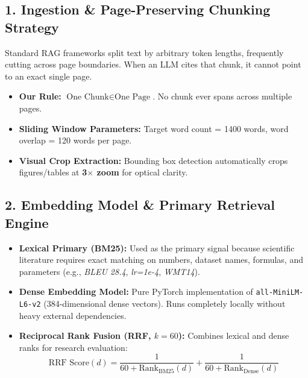 \documentclass[10pt,a4paper]{article}
\begin{document}
\subsection{1. Ingestion \& Page-Preserving Chunking Strategy}
Standard RAG frameworks split text by arbitrary token lengths, frequently cutting across page boundaries. When an LLM cites that chunk, it cannot point to an exact single page.
\begin{itemize}[leftmargin=1.5em]
    \item \textbf{Our Rule:} $\text{One Chunk} \in \text{One Page}$. No chunk ever spans across multiple pages.
    \item \textbf{Sliding Window Parameters:} Target word count = 1400 words, word overlap = 120 words per page.
    \item \textbf{Visual Crop Extraction:} Bounding box detection automatically crops figures/tables at \textbf{3$\times$ zoom} for optical clarity.
\end{itemize}

\subsection{2. Embedding Model \& Primary Retrieval Engine}
\begin{itemize}[leftmargin=1.5em]
    \item \textbf{Lexical Primary (BM25):} Used as the primary signal because scientific literature requires exact matching on numbers, dataset names, formulas, and parameters (e.g., \textit{BLEU 28.4}, \textit{lr=1e-4}, \textit{WMT14}).
    \item \textbf{Dense Embedding Model:} Pure PyTorch implementation of \texttt{all-MiniLM-L6-v2} (384-dimensional dense vectors). Runs completely locally without heavy external dependencies.
    \item \textbf{Reciprocal Rank Fusion (RRF, $k=60$):} Combines lexical and dense ranks for research evaluation:
    $$\text{RRF Score}(d) = \frac{1}{60 + \text{Rank}_{\text{BM25}}(d)} + \frac{1}{60 + \text{Rank}_{\text{Dense}}(d)}$$
\end{itemize}
\end{document}
